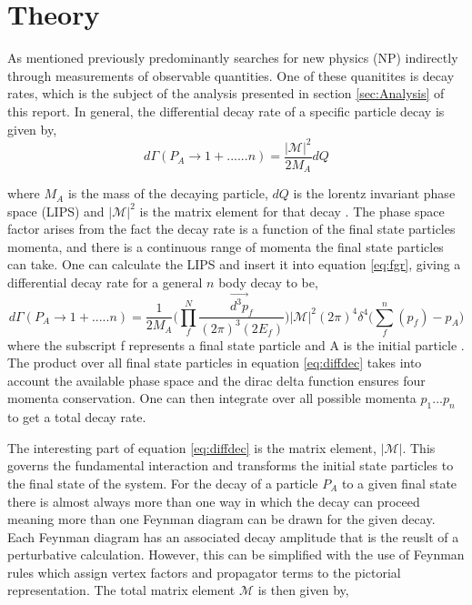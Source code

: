 
\section{Theory}
\label{sec:Theory}


As mentioned previously \lhcb predominantly searches for new physics (NP) indirectly through measurements of observable quantities.  One of these quanitites is decay rates, which is the subject of the analysis presented in section \ref{sec:Analysis} of this report.  In general, the differential decay rate of a specific particle decay is given by,
\begin{equation}
  \label{eq:fgr}
  d\Gamma(P_A\to1 + ......n) = \frac{|\mathscr{M}|^2}{2M_A}dQ
\end{equation}

where $M_A$ is the mass of the decaying particle, $dQ$ is the lorentz invariant phase space (LIPS) and $|\mathscr{M}|^2$ is the matrix element for that decay \cite{halzen1984quarks}.  The phase space factor arises from the fact the decay rate is a function of the final state particles momenta, and there is a continuous range of momenta the final state particles can take.  One can calculate the LIPS and insert it into equation \ref{eq:fgr}, giving a differential decay rate for a general $n$ body decay to be,
\begin{equation}
  \label{eq:diffdec}
  d\Gamma(P_A \to 1+ .....n) = \frac{1}{2M_A}\bigg(\prod_{f}^{N}\frac{\vec{d^3p}_f}{(2\pi)^3(2E_f)}\bigg)|\mathscr{M}|^2(2\pi)^4\delta^4\bigg(\sum_{f}^n(p_f)-p_A\bigg)
\end{equation}
where the subscript f represents a final state particle and A is the initial particle \cite{halzen1984quarks}. The product over all final state particles in equation \ref{eq:diffdec} takes into account the available phase space and the dirac delta function ensures four momenta conservation.  One can then integrate over all possible momenta $p_1...p_n$ to get a total decay rate.

The interesting part of equation {\ref{eq:diffdec}} is the matrix element, $|\mathscr{M}|$.  This governs the fundamental interaction and transforms the initial state particles to the final state of the system.  For the decay of a particle $P_A$ to a given final state there is almost always more than one way in which the decay can proceed meaning more than one Feynman diagram can be drawn for the given decay.  Each Feynman diagram has an associated decay amplitude that is the reuslt of a perturbative calculation.  However, this can be simplified with the use of Feynman rules which assign vertex factors and propagator terms to the pictorial representation.  The total matrix element $\mathscr{M}$ is then given by,

